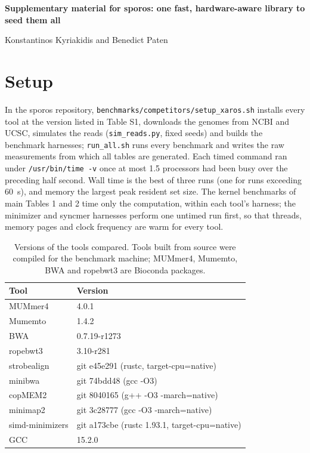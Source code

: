 \documentclass[10pt]{article}
\begin{document}
{\Large\bfseries Supplementary material for sporos: one fast, hardware-aware library to seed them all\par}\medskip
{\large Konstantinos Kyriakidis and Benedict Paten}\par\bigskip
\section{Setup}

In the sporos repository, \texttt{benchmarks/competitors/setup\_xaros.sh} installs every tool at the version listed in Table S1, downloads the genomes from NCBI and UCSC, simulates the reads (\texttt{sim\_reads.py}, fixed seeds) and builds the benchmark harnesses; \texttt{run\_all.sh} runs every benchmark and writes the raw measurements from which all tables are generated. Each timed command ran under \texttt{/usr/bin/time -v} once at most 1.5 processors had been busy over the preceding half second. Wall time is the best of three runs (one for runs exceeding 60~s), and memory the largest peak resident set size. The kernel benchmarks of main Tables 1 and 2 time only the computation, within each tool's harness; the minimizer and syncmer harnesses perform one untimed run first, so that threads, memory pages and clock frequency are warm for every tool.

\begin{table}[H]
\caption{Versions of the tools compared. Tools built from source were compiled for the benchmark machine; MUMmer4, Mumemto, BWA and ropebwt3 are Bioconda packages.}\label{tab:versions}
\centering\footnotesize
\setlength{\tabcolsep}{4pt}
\begin{tabular}{@{}ll@{}}
\toprule
Tool & Version \\
\midrule
MUMmer4 & 4.0.1 \\
Mumemto & 1.4.2 \\
BWA & 0.7.19-r1273 \\
ropebwt3 & 3.10-r281 \\
strobealign & git e45e291 (rustc, target-cpu=native) \\
minibwa & git 74bdd48 (gcc -O3) \\
copMEM2 & git 8040165 (g++ -O3 -march=native) \\
minimap2 & git 3c28777 (gcc -O3 -march=native) \\
simd-minimizers & git a173cbe (rustc 1.93.1, target-cpu=native) \\
GCC & 15.2.0 \\
\bottomrule
\end{tabular}
\end{table}
\end{document}
